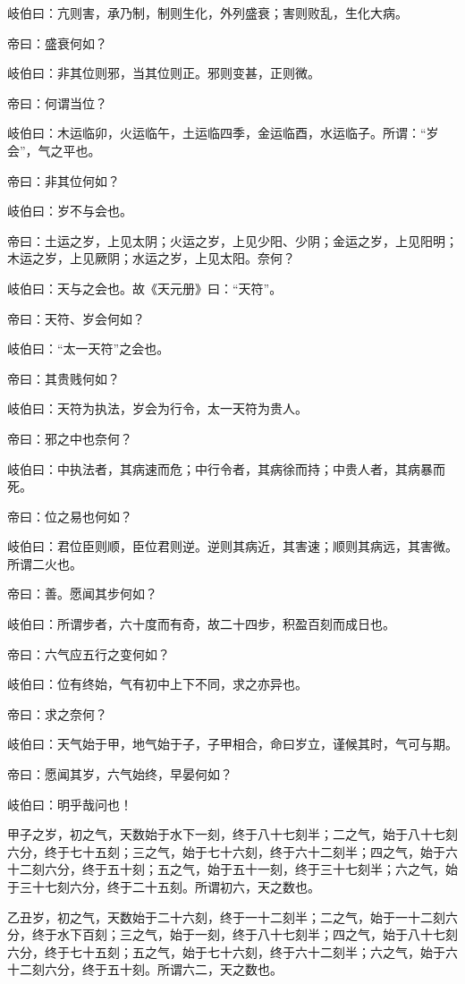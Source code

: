 \documentclass{article}%
\begin{document}
岐伯曰：亢则害，承乃制，制则生化，外列盛衰；害则败乱，生化大病。

帝曰：盛衰何如？

岐伯曰：非其位则邪，当其位则正。邪则变甚，正则微。

帝曰：何谓当位？

岐伯曰：木运临卯，火运临午，土运临四季，金运临酉，水运临子。所谓：“岁会”，气之平也。

帝曰：非其位何如？

岐伯曰：岁不与会也。

帝曰：土运之岁，上见太阴；火运之岁，上见少阳、少阴；金运之岁，上见阳明；木运之岁，上见厥阴；水运之岁，上见太阳。奈何？

岐伯曰：天与之会也。故《天元册》曰：“天符”。

帝曰：天符、岁会何如？

岐伯曰：“太一天符”之会也。

帝曰：其贵贱何如？

岐伯曰：天符为执法，岁会为行令，太一天符为贵人。

帝曰：邪之中也奈何？

岐伯曰：中执法者，其病速而危；中行令者，其病徐而持；中贵人者，其病暴而死。

帝曰：位之易也何如？

岐伯曰：君位臣则顺，臣位君则逆。逆则其病近，其害速；顺则其病远，其害微。所谓二火也。

帝曰：善。愿闻其步何如？

岐伯曰：所谓步者，六十度而有奇，故二十四步，积盈百刻而成日也。

帝曰：六气应五行之变何如？

岐伯曰：位有终始，气有初中上下不同，求之亦异也。

帝曰：求之奈何？

岐伯曰：天气始于甲，地气始于子，子甲相合，命曰岁立，谨候其时，气可与期。

帝曰：愿闻其岁，六气始终，早晏何如？

岐伯曰：明乎哉问也！

甲子之岁，初之气，天数始于水下一刻，终于八十七刻半；二之气，始于八十七刻六分，终于七十五刻；三之气，始于七十六刻，终于六十二刻半；四之气，始于六十二刻六分，终于五十刻；五之气，始于五十一刻，终于三十七刻半；六之气，始于三十七刻六分，终于二十五刻。所谓初六，天之数也。

乙丑岁，初之气，天数始于二十六刻，终于一十二刻半；二之气，始于一十二刻六分，终于水下百刻；三之气，始于一刻，终于八十七刻半；四之气，始于八十七刻六分，终于七十五刻；五之气，始于七十六刻，终于六十二刻半；六之气，始于六十二刻六分，终于五十刻。所谓六二，天之数也。
\end{document}
